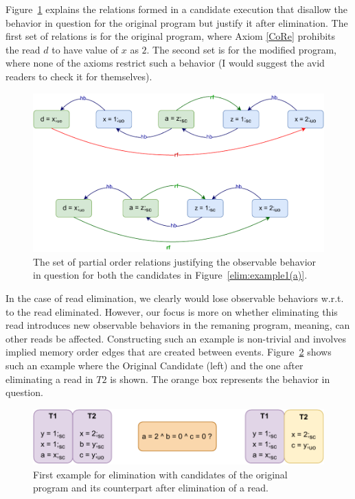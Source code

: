     Figure~\ref{elim:example1(b)} explains the relations formed in a candidate execution that disallow the behavior in question for the original program but justify it after elimination. 
    The first set of relations is for the original program, where Axiom \ref{CoRe} prohibits the read $d$ to have value of $x$ as $2$.
    The second set is for the modified program, where none of the axioms restrict such a behavior (I would suggest the avid readers to check it for themselves).
    \begin{figure}[H]
        \centering
        \includegraphics[scale=0.7]{6.Elimination/EliminationExample1(b).pdf}
        \caption{The set of partial order relations justifying the observable behavior in question for both the candidates in Figure~\ref{elim:example1(a)}.} 
        \label{elim:example1(b)}
    \end{figure}

    In the case of read elimination, we clearly would lose observable behaviors w.r.t. to the read eliminated.
    However, our focus is more on whether eliminating this read introduces new observable behaviors in the remaning program, meaning, can other reads be affected.
    Constructing such an example is non-trivial and involves implied memory order edges that are created between events.
    Figure~\ref{elim:example2(a)} shows such an example where the Original Candidate (left) and the one after eliminating a read in $T2$ is shown.
    The orange box represents the behavior in question. 
    \begin{figure}[H]
        \centering
        \includegraphics[scale=0.7]{6.Elimination/EliminationExample2(a).pdf}
        \caption{First example for elimination with candidates of the original program and its counterpart after elimination of a read.} 
        \label{elim:example2(a)}
    \end{figure}

